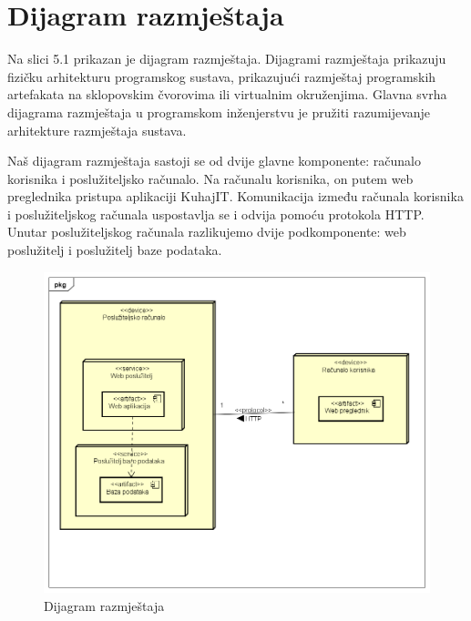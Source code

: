 			\eject 
		
		
		\section{Dijagram razmještaja}
			
		
		Na slici 5.1 prikazan je dijagram razmještaja. Dijagrami razmještaja prikazuju fizičku arhitekturu programskog sustava, prikazujući razmještaj programskih artefakata na sklopovskim čvorovima ili virtualnim okruženjima. Glavna svrha dijagrama razmještaja u programskom inženjerstvu je pružiti razumijevanje arhitekture razmještaja sustava.
		
		Naš dijagram razmještaja sastoji se od dvije glavne komponente: računalo korisnika i poslužiteljsko računalo. Na računalu korisnika, on putem web preglednika pristupa aplikaciji KuhajIT. Komunikacija između računala korisnika i poslužiteljskog računala uspostavlja se i odvija pomoću protokola HTTP. Unutar poslužiteljskog računala razlikujemo dvije podkomponente: web poslužitelj i poslužitelj baze podataka.
		
					\begin{figure}[H]
			\includegraphics[scale=0.4]{dijagrami/UML_dijagram_razmjestaja.PNG} %
			\centering
			\caption{Dijagram razmještaja}
			\label{Dijagram razmještaja}
		\end{figure}
		
		

			\eject 
		
